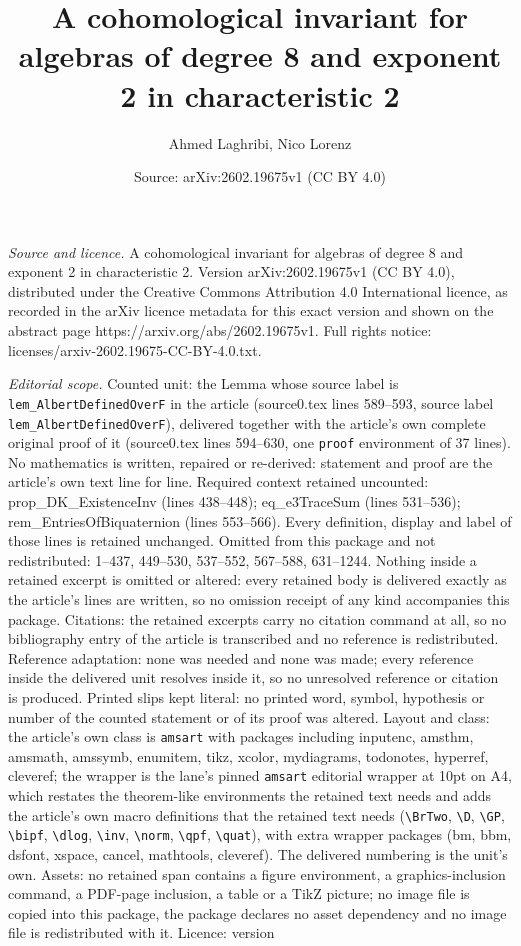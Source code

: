 \documentclass[10pt,a4paper]{amsart}
\title[A cohomological invariant for algebras of degree 8 and expon]{A cohomological invariant for algebras of degree 8 and exponent 2 in characteristic 2}
\author{Ahmed Laghribi, Nico Lorenz}
\date{Source: arXiv:2602.19675v1 (CC BY 4.0)}
\begin{document}
\maketitle

\noindent\emph{Source and licence.} A cohomological invariant for algebras of degree 8 and exponent 2 in characteristic 2. Version arXiv:2602.19675v1 (CC BY 4.0), distributed under the Creative Commons Attribution 4.0 International licence, as recorded in the arXiv licence metadata for this exact version and shown on the abstract page https://arxiv.org/abs/2602.19675v1. Full rights notice: licenses/arxiv-2602.19675-CC-BY-4.0.txt.\par\smallskip

\noindent\textit{Editorial scope.} Counted unit: the Lemma whose source label is \texttt{lem\_AlbertDefinedOverF} in the article (source0.tex lines 589--593, source label \texttt{lem\_AlbertDefinedOverF}), delivered together with the article's own complete original proof of it (source0.tex lines 594--630, one \texttt{proof} environment of 37 lines). No mathematics is written, repaired or re-derived: statement and proof are the article's own text line for line. Required context retained uncounted: prop\_DK\_ExistenceInv (lines 438--448); eq\_e3TraceSum (lines 531--536); rem\_EntriesOfBiquaternion (lines 553--566). Every definition, display and label of those lines is retained unchanged. Omitted from this package and not redistributed: 1--437, 449--530, 537--552, 567--588, 631--1244. Nothing inside a retained excerpt is omitted or altered: every retained body is delivered exactly as the article's lines are written, so no omission receipt of any kind accompanies this package. Citations: the retained excerpts carry no citation command at all, so no bibliography entry of the article is transcribed and no reference is redistributed. Reference adaptation: none was needed and none was made; every reference inside the delivered unit resolves inside it, so no unresolved reference or citation is produced. Printed slips kept literal: no printed word, symbol, hypothesis or number of the counted statement or of its proof was altered. Layout and class: the article's own class is \texttt{amsart} with packages including inputenc, amsthm, amsmath, amssymb, enumitem, tikz, xcolor, mydiagrams, todonotes, hyperref, cleveref; the wrapper is the lane's pinned \texttt{amsart} editorial wrapper at 10pt on A4, which restates the theorem-like environments the retained text needs and adds the article's own macro definitions that the retained text needs (\texttt{\textbackslash BrTwo}, \texttt{\textbackslash D}, \texttt{\textbackslash GP}, \texttt{\textbackslash bipf}, \texttt{\textbackslash dlog}, \texttt{\textbackslash inv}, \texttt{\textbackslash norm}, \texttt{\textbackslash qpf}, \texttt{\textbackslash quat}), with extra wrapper packages (bm, bbm, dsfont, xspace, cancel, mathtools, cleveref). The delivered numbering is the unit's own. Assets: no retained span contains a figure environment, a graphics-inclusion command, a PDF-page inclusion, a table or a TikZ picture; no image file is copied into this package, the package declares no asset dependency and no image file is redistributed with it. Licence: version 
\end{document}
